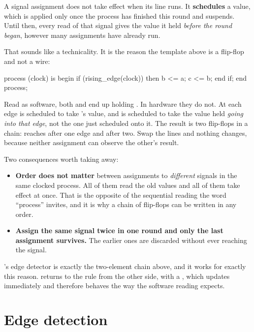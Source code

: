 A signal assignment does not take effect when its line runs. It \textbf{schedules} a value, which
is applied only once the process has finished this round and suspends. Until then, every read of
that signal gives the value it held \emph{before the round began}, however many assignments have
already run.

That sounds like a technicality. It is the reason the template above is a flip-flop and not a wire:

\begin{vhdlcode}
process (clock) is
begin
    if (rising_edge(clock)) then
        b <= a;
        c <= b;
    end if;
end process;
\end{vhdlcode}

Read as software, both  and  end up holding . In hardware they do not. At
each edge  is scheduled to take 's value, and  is scheduled to take the
value  held \emph{going into that edge}, not the one just scheduled onto it. The result is
two flip-flops in a chain:  reaches  after one edge and  after two. Swap
the lines and nothing changes, because neither assignment can observe the other's result.

Two consequences worth taking away:
\begin{itemize}
  \item \textbf{Order does not matter} between assignments to \emph{different} signals in the same
    clocked process. All of them read the old values and all of them take effect at once. That is
    the opposite of the sequential reading the word ``process'' invites, and it is why a chain of
    flip-flops can be written in any order.
  \item \textbf{Assign the same signal twice in one round and only the last assignment survives.}
    The earlier ones are discarded without ever reaching the signal.
\end{itemize}

's edge detector is exactly the two-element chain above, and it works for
exactly this reason.  returns to the rule from the other side, with a
, which updates immediately and therefore behaves the way the software reading
expects.

\section{Edge detection}
\label{c3:sec:edge}

